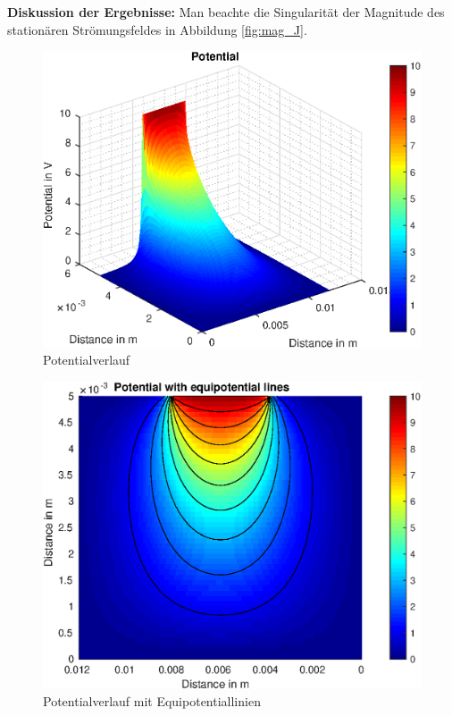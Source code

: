 \textbf{Diskussion der Ergebnisse:}
Man beachte die Singularität der Magnitude des stationären Strömungsfeldes in Abbildung \ref{fig:mag_J}.

\begin{figure}[H]
	\centering
	\includegraphics[scale=1]{pics/Bsp_2/fig_1.eps}
	\caption{Potentialverlauf}
\end{figure}

\begin{figure}[H]
	\centering
	\includegraphics[scale=1]{pics/Bsp_2/fig_2.eps}
	\caption{Potentialverlauf mit Equipotentiallinien}
\end{figure}

